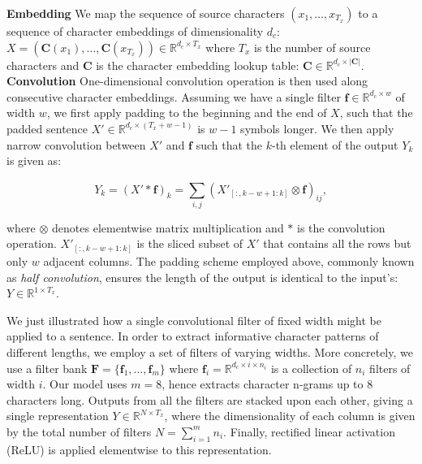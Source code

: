 \documentclass[11pt,letterpaper]{article}
\newcommand{\ti}{\textit}
\newcommand{\mb}{\mathbf}
\newcommand{\nrr}{\color{black}}
\begin{document}
    \noindent\textbf{Embedding} We map the {\nrr sequence of source characters $(x_1, \ldots, x_{T_x})$ to a sequence of character embeddings of dimensionality $d_c$: $X = (\mb{C}(x_1), \ldots, \mb{C}(x_{T_x})) \in \mathbb{R}^{d_c \times T_x}$ where $T_x$ is the number of source characters }and $\mb{C}$ is the character embedding lookup table: $\mb{C} \in \mathbb{R}^{d_c \times |\mb{C}|}$.\\
    
    \noindent\textbf{Convolution} One-dimensional convolution operation is then used along consecutive character embeddings. Assuming we have a single filter $\mb{f} \in \mathbb{R}^{d_c \times w}$ of width $w$, we first apply padding to the beginning and the end of $X$, such that the padded sentence $X' \in \mathbb{R}^{d_c \times (T_x + w - 1)}$ is $w-1$ symbols longer. We then apply narrow convolution between $X'$ and $\mb{f}$ such that the $k$-th element of the output $Y_k$ is given as:
    
    \vspace{-4mm}
    \begin{equation}
        Y_k = (X' * \mb{f})_k = \sum_{i,j}^{}{(X'_{[:,k-w+1:k]} \otimes \mb{f})}_{ij},
    \end{equation}
    \vspace{-4mm}

    where $\otimes$ denotes elementwise matrix multiplication and $*$ is the convolution operation. $X'_{[:,k-w+1:k]}$ is the sliced subset of $X'$ that contains all the rows but only $w$ adjacent columns. The padding scheme employed above, commonly known as \ti{half convolution}, ensures the length of the output is identical to the input's: $Y \in \mathbb{R}^{1 \times T_x}.$

    We just illustrated how a single convolutional filter of fixed width might be applied to a sentence. In order to extract informative character patterns of different lengths, we employ a set of filters of varying widths. More concretely, we use a filter bank $\mb{F} = \{\mb{f}_1, \ldots, \mb{f}_{m}\}$ where $\mb{f}_i = \mathbb{R}^{d_c \times i \times n_i}$ is a collection of $n_i$ filters of width $i$. Our model uses $m=8$, hence extracts character n-grams up to $8$ characters long. Outputs from all the filters are stacked upon each other, giving a single representation $Y \in \mathbb{R}^{N \times T_x}$, where the dimensionality of each column is given by the total number of filters $N = \sum_{i=1}^{m}n_i$. Finally, rectified linear activation (ReLU) is applied elementwise to this representation. \\
\end{document}
